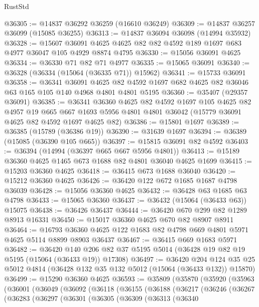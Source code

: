 \begin{lexlean}{RustStd}
\begin{coremodule}
@36305 := @14837 @36292 @36259 (@16610 @36249)
@36309 := @14837 @36257 @36099 (@15085 @36255)
@36313 := @14837 @36094 @36098 (@14994 @35932)
@36328 := @15607
    @36091
    @4625
    @4625
    @82
    @82
    @4592
    @189
    @1697
    @683
    @4977
    @36047
    @105
    @4929
    @8874
    @4795
@36330 := @15056 @36091 @4625
@36334 := @36330 @71 @82 @71 @4977
@36335 := @15065 @36091
@36340 := @36328 (@36334 (@15064 (@36335 @71)) @15962)
@36341 := @15733 @36091
@36358 := @36341
    @36091
    @4625
    @82
    @4592
    @1697
    @682
    @4625
    @82
    @36046
    @63
    @165
    @105
    @140
    @4968
    @4801
    @4801
    @5195
@36360 := @35407 (@29357 @36091)
@36385 := @36341
    @36360
    @4625
    @82
    @4592
    @1697
    @105
    @4625
    @82
    @4957
    @19
    @665
    @667
    @1693
    @5956
    @4801
    @4801
    @36042
    (@15779 @36091 @4625 @82 @4592 @1697 @4625 @82)
@36386 := @15801 @1697
@36389 := @36385 (@15789 (@36386 @19))
@36390 := @31639 @1697
@36394 := @36389 (@15085 (@36390 @105 @665))
@36397 := @15815 @36091 @82 @4592
@36403 := @36394 (@14994 (@36397 @665 @667 @5956 @4801))
@36413 := @15189 @36360 @4625 @1465 @673 @1688 @82 @4801 @36040 @4625 @1699
@36415 := @15203 @36360 @4625
@36418 := @36415 @673 @1688 @36040
@36420 := @15212 @36360 @4625
@36426 := @36420 @122 @672 @1685 @1687 @4798 @36039
@36428 := @15056 @36360 @4625
@36432 := @36428 @63 @1685 @63 @4798
@36433 := @15065 @36360
@36437 := @36432 (@15064 (@36433 @63)) @15075
@36438 := @36426 @36437
@36444 := @36420 @670 @299 @82 @1289 @8913 @16331
@36450 := @15017 @36360 @4625 @670 @82 @8907 @8911
@36464 := @16793 @36360 @4625 @122 @1683 @82 @4798 @669 @4801 @5971 @4625 @5114 @8899 @8903 @36437
@36467 := @36415 @669 @1683 @5971
@36482 := @36420
    @140
    @206
    @82
    @37
    @5195
    @5014
    (@36428 @19 @82 @19 @5195 (@15064 (@36433 @19)) @17308)
@36497 := @36420
    @204
    @124
    @35
    @25
    @5012
    @4814
    (@36428 @132 @35 @132 @5012 (@15064 (@36433 @132)) @15870)
@36499 := @15290 @36360 @4625
@36593 := @35809
    (@35870
      (@35920
        (@35963
          (@36001
            (@36049
              (@36092
                (@36118
                  (@36155
                    (@36188
                      (@36217
                        (@36246
                          (@36267
                            (@36283
                              (@36297
                                (@36301
                                  (@36305
                                    (@36309
                                      (@36313
                                        (@36340

\end{coremodule}
\end{lexlean}
